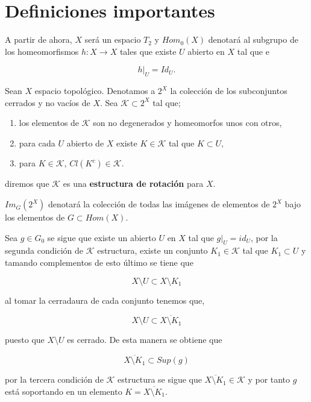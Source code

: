 






\section{Definiciones importantes}
A partir de ahora, $X$ será un espacio $T_2$ y  $Hom_0(X)$ denotará al subgrupo de los homeomorfismos $h:X \to X$ tales que existe $U$ abierto en $X$ tal que e 

$$h|_U=Id_U.$$
	 
\begin{df}
Sean $X$ espacio topológico. Denotamos a $2^X$ la colección de los subconjuntos cerrados y no vacíos de $X$.  Sea $\mathcal{K} \subset 2^X$ tal que;
 \begin{enumerate}
\item los elementos de $\mathcal{K}$ son no degenerados y homeomorfos unos con otros,
\item para cada $U$ abierto de $X$ existe $K \in \mathcal{K}$ tal que $K \subset U,$
\item para $K \in \mathcal{K}$, $Cl(K^c) \in \mathcal{K}.$
\end{enumerate}

diremos que $\mathcal{K}$ es una \textbf{estructura de rotación} para $X$.
\end{df}

\begin{cn}
$Im_G(2^X)$ denotará la colección de todas las imágenes de elementos de $2^X$ bajo los elementos de $G \subset Hom(X).$
\end{cn}


\begin{ob}\label{ob:hom_sop_en_Ks}
Sea $g \in G_0$ se sigue que existe un abierto $U$ en $X$ tal que $g|_U=id_U$, por la segunda condición de $\mathcal{K}$ estructura, existe un conjunto $K_1 \in \mathcal{K}$ tal que $K_1 \subset U$ y tamando complementos de esto último se tiene que 

$$X \setminus U \subset X \setminus K_1$$

al tomar la cerradaura de cada conjunto tenemos que,

$$X \setminus U \subset \overline{ X \setminus K_1}$$

puesto que $X \setminus U$ es cerrado. De esta manera se obtiene que 

$$ \overline{ X \setminus K_1}  \subset Sup(g) $$

por la tercera condición de $\mathcal{K}$ estructura se sigue que $\overline{ X \setminus K_1} \in \mathcal{K}$ y por tanto $g$ está soportando en un elemento $K = \overline{ X \setminus K_1}$.
\end{ob}


